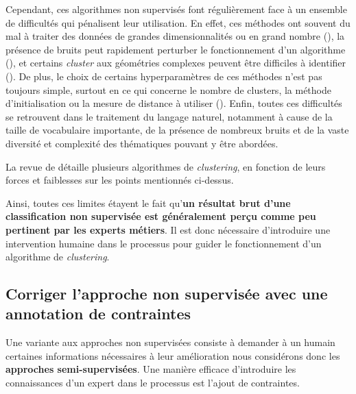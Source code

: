 		Cependant, ces algorithmes non supervisés font régulièrement face à un ensemble de difficultés qui pénalisent leur utilisation.
		En effet, ces méthodes ont souvent du mal à traiter des données de grandes dimensionnalités ou en grand nombre (\cite{steinbach-etal:2004:challenges-clustering-high}), la présence de bruits peut rapidement perturber le fonctionnement d'un algorithme (\cite{yang-wang:2004:competitive-algorithms-clustering}), et certains \textit{cluster} aux géométries complexes peuvent être difficiles à identifier (\cite{kriegel-etal:2011:density-based-clustering}).
		De plus, le choix de certains hyperparamètres de ces méthodes n'est pas toujours simple, surtout en ce qui concerne le nombre de clusters, la méthode d'initialisation ou la mesure de distance à utiliser (\cite{agarwal-etal:2011:issues-challenges-tools}).
		Enfin, toutes ces difficultés se retrouvent dans le traitement du langage naturel, notamment à cause de la taille de vocabulaire importante, de la présence de nombreux bruits et de la vaste diversité et complexité des thématiques pouvant y être abordées.
		\begin{leftBarInformation}
			La revue de \cite{xu-tian:2015:comprehensive-survey-clustering} détaille plusieurs algorithmes de \textit{clustering}, en fonction de leurs forces et faiblesses sur les points mentionnés ci-dessus.
		\end{leftBarInformation}
		
		Ainsi, toutes ces limites étayent le fait qu'\textbf{un résultat brut d'une classification non supervisée est généralement perçu comme peu pertinent par les experts métiers}.
		Il est donc nécessaire d'introduire une intervention humaine dans le processus pour guider le fonctionnement d'un algorithme de \textit{clustering}.
		
	
	\subsection{Corriger l'approche non supervisée avec une annotation de contraintes}
	\label{section:3.1.2-INTUITIONS-ORIGINES-SEMI-SUPERVISEES}
	
		Une variante aux approches non supervisées consiste à demander à un humain certaines informations nécessaires à leur amélioration nous considérons donc les \textbf{approches semi-supervisées}.
		Une manière efficace d'introduire les connaissances d'un expert dans le processus est l'ajout de contraintes.
		
